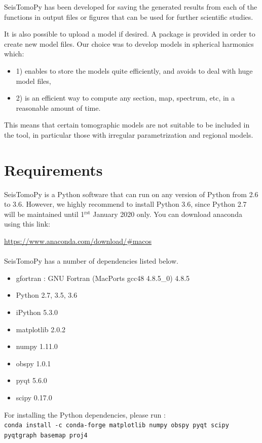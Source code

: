 \documentclass[12pt]{article}
\begin{document}
SeisTomoPy has been developed for saving the generated results from each of the functions in output files or figures that can be used for further scientific studies. 

It is also possible to upload a model if desired. A package is provided in order to create new model files. Our choice was to  develop models in spherical harmonics which:
\begin{itemize}
\item 1) enables to store the models quite efficiently, and avoids to deal with huge model files,
\item 2) is an efficient way to compute any section, map, spectrum, etc, in a reasonable amount of time.
\end{itemize}
This means that certain tomographic models are not suitable to be included in the tool, in particular those with irregular parametrization and regional models. 

\newpage

\section{Requirements}

SeisTomoPy is a Python software that can run on any version of Python from 2.6 to 3.6. However, we highly recommend to install Python 3.6, since Python 2.7 will be maintained until 1$^\textrm{rst}$ January 2020 only. You can download anaconda using this link:

\noindent \url{https://www.anaconda.com/download/#macos}
\\
\\
SeisTomoPy has a number of dependencies listed below.

\begin{itemize}
    \item gfortran : GNU Fortran (MacPorts gcc48 4.8.5\_0) 4.8.5
\item Python 2.7, 3.5, 3.6
\item iPython 5.3.0
\item matplotlib 2.0.2
\item  numpy 1.11.0
\item obspy 1.0.1
\item pyqt 5.6.0
\item scipy 0.17.0
\end{itemize}
For installing the Python dependencies, please run :\\
\verb?conda install -c conda-forge matplotlib numpy obspy pyqt scipy pyqtgraph basemap proj4?\\
\end{document}
